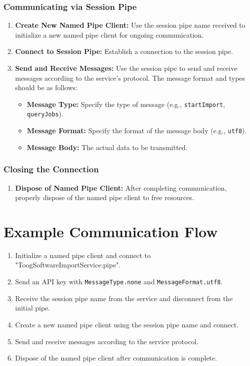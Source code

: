 \documentclass{memoir}
\begin{document}
	\subsubsection{Communicating via Session Pipe}
	\begin{enumerate}
		\item \textbf{Create New Named Pipe Client:} Use the session pipe name received to initialize a new named pipe client for ongoing communication.
		\item \textbf{Connect to Session Pipe:} Establish a connection to the session pipe.
		\item \textbf{Send and Receive Messages:} Use the session pipe to send and receive messages according to the service's protocol. The message format and types should be as follows:
		\begin{itemize}
			\item \textbf{Message Type:} Specify the type of message (e.g., \texttt{startImport}, \texttt{queryJobs}).
			\item \textbf{Message Format:} Specify the format of the message body (e.g., \texttt{utf8}).
			\item \textbf{Message Body:} The actual data to be transmitted.
		\end{itemize}
	\end{enumerate}
	
	\subsubsection{Closing the Connection}
	\begin{enumerate}
		\item \textbf{Dispose of Named Pipe Client:} After completing communication, properly dispose of the named pipe client to free resources.
	\end{enumerate}
	
	\section{Example Communication Flow}
	\begin{enumerate}
		\item Initialize a named pipe client and connect to "ToogSoftwareImportService.pipe".
		\item Send an API key with \texttt{MessageType.none} and \texttt{MessageFormat.utf8}.
		\item Receive the session pipe name from the service and disconnect from the initial pipe.
		\item Create a new named pipe client using the session pipe name and connect.
		\item Send and receive messages according to the service protocol.
		\item Dispose of the named pipe client after communication is complete.
	\end{enumerate}
	
\end{document}
